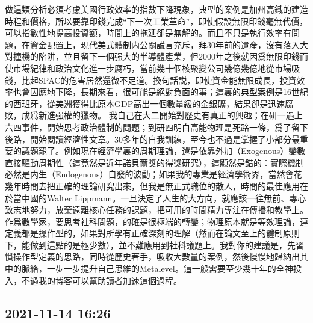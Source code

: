 \documentclass[twocolumn]{ctexart}
\begin{document}
做這類分析必須考慮美國行政效率的指數下降現象，典型的案例是加州高鐵的建造時程和價格，所以要靠印錢完成“下一次工業革命”，即使假設無限印錢毫無代價，可以指數性地提高投資額，時間上的拖延卻是無解的。而且不只是執行效率有問題，在資金配置上，現代美式體制内公關謊言充斥，拜30年前的遺產，沒有落入大對撞機的陷阱，並且留下一個强大的半導體產業，但2000年之後就因爲無限印錢而使市場紀律和政治文化進一步腐朽，當前幾十個核聚變公司幾億幾億地從市場吸錢，比起SPAC的危害居然還微不足道。換句話説，即使資金能無限成長，投資效率也會因應地下降，長期來看，很可能是絕對負面的事；這裏的典型案例是16世紀的西班牙，從美洲獲得比原本GDP高出一個數量級的金銀礦，結果卻是迅速腐敗，成爲新進强權的獵物。
我自己在大二開始對歷史有真正的興趣；在研一遇上六四事件，開始思考政治體制的問題；到研四明白高能物理是死路一條，爲了留下後路，開始閲讀經濟性文章。30多年的自我訓練，至今也不過是掌握了小部分最重要的議題罷了。例如現在經濟學裏的周期理論，還是依靠外加（Exogenous）變數直接驅動周期性（這竟然是近年諾貝爾獎的得獎研究），這顯然是錯的：實際機制必然是内生（Endogenous）自發的波動；如果我的專業是經濟學術界，當然會花幾年時間去把正確的理論研究出來，但我是無正式職位的散人，時間的最佳應用在於當中國的Walter Lippmann。一旦決定了人生的大方向，就應該一往無前、專心致志地努力，放棄遠離核心任務的課題，把可用的時間精力專注在傳播和教學上。
作爲數學家，要思考社科問題，的確是很極端的轉變；物理原本就是等效理論，連定義都是操作型的，如果對所學有正確深刻的理解（然而在論文至上的體制原則下，能做到這點的是極少數），並不難應用到社科議題上。我對你的建議是，先習慣操作型定義的思路，同時從歷史著手，吸收大數量的案例，然後慢慢地歸納出其中的脈絡，一步一步提升自己思維的Metalevel。這一般需要至少幾十年的全神投入，不過我的博客可以幫助讀者加速這個過程。
\subsection*{2021-11-14 16:26}
\end{document}
